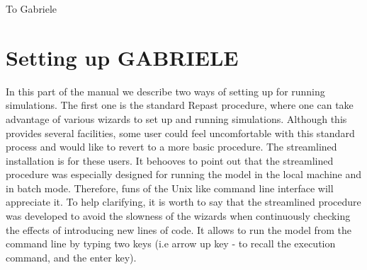 \documentclass{book}
\begin{document}
\newpage
\thispagestyle{empty}

\null

\newpage
\thispagestyle{empty}

\vspace*{5cm}
\begin{flushright}
	To Gabriele
\end{flushright}

\newpage
\thispagestyle{empty}

\null

\newpage


\tableofcontents
 





\printglossaries

\clearpage
\thispagestyle{empty}

\part{Setting up GABRIELE}


In this part of the manual we describe two ways of setting up for running simulations. The first one is the standard Repast procedure, where one can take advantage of various wizards to set up and running simulations. Although this provides several facilities, some user could feel uncomfortable with this standard process and would like to revert to a more basic procedure. The streamlined installation is for these users. It behooves to point out that the streamlined procedure was especially designed for running the model in the local machine and in batch mode. Therefore, funs of the Unix like command line interface will appreciate it. To help clarifying, it is worth to say that the streamlined procedure was developed to avoid the slowness of the wizards when continuously checking the effects of introducing new lines of code. It allows to run the model from the command line by typing two keys (i.e arrow up key - to recall the execution command, and the enter key). 
\end{document}

